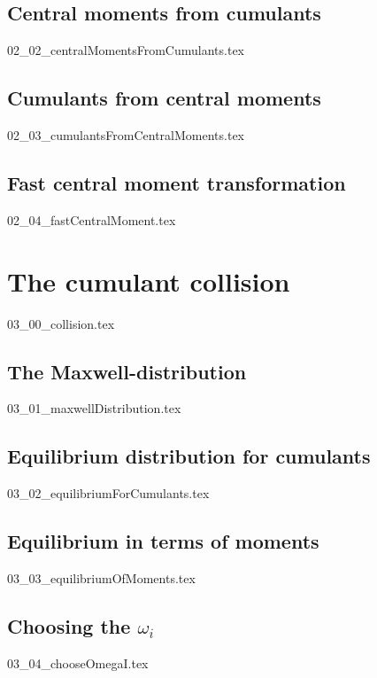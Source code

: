 \documentclass[12pt,a4paper,twoside]{article}
\begin{document}
\subsection{Central moments from cumulants}
\label{sub: Central moments from cumulants}
{02_02_centralMomentsFromCumulants.tex}

\subsection{Cumulants from central moments}
\label{sub: Cumulants from central moments}
{02_03_cumulantsFromCentralMoments.tex}

\subsection{Fast central moment transformation}
\label{sub: Fast central moment transformation}
{02_04_fastCentralMoment.tex}

\section{The cumulant collision}
\label{sec: The cumulant collision}
{03_00_collision.tex}

\subsection{The Maxwell-distribution}
\label{sub: The Maxwell-distribution}
{03_01_maxwellDistribution.tex}

\subsection{Equilibrium distribution for cumulants}
\label{sub: Equilibrium distribution for cumulants}
{03_02_equilibriumForCumulants.tex}

\subsection{Equilibrium in terms of moments}
\label{sub: Equilibrium in terms of moments}
{03_03_equilibriumOfMoments.tex}

\subsection{Choosing the \texorpdfstring{$\omega_i$}{omega i}}
\label{sub: Choosing the omega i}
{03_04_chooseOmegaI.tex}
\end{document}
